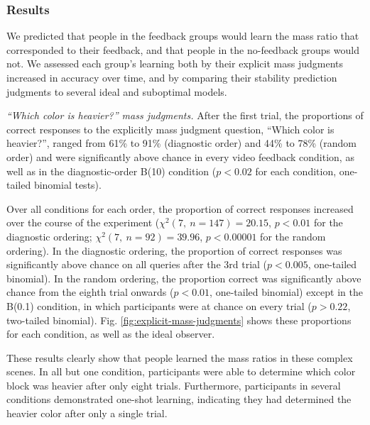 \documentclass[10pt,letterpaper]{article}
\newcommand{\TODO}[1]{\textcolor{red}{[TODO: #1]}}
\newcommand{\vfb}[0]{video feedback}
\newcommand{\fblow}[0]{B(0.1)}
\newcommand{\fbhigh}[0]{B(10)}
\newcommand{\diag}[1]{diagnostic-order #1}
\begin{document}



\subsubsection{Results}

We predicted that people in the feedback groups would learn the mass
ratio that corresponded to their feedback, and that people in the
no-feedback groups would not. We assessed each group's learning both
by their explicit mass judgments increased in accuracy over time, and
by comparing their stability prediction judgments to several ideal and
suboptimal models.

\textit{``Which color is heavier?'' mass judgments.} After the first
trial, the proportions of correct responses to the explicitly mass
judgment question, ``Which color is heavier?'', ranged from 61\% to
91\% (diagnostic order) and 44\% to 78\% (random order) and were
significantly above chance in every \vfb{} condition, as well as in
the \diag{\fbhigh{}} condition ($p<0.02$ for each condition,
one-tailed binomial tests).

Over all conditions for each order, the proportion of correct
responses increased over the course of the experiment ($\chi^2(7,\
n=147)=20.15$, $p<0.01$ for the diagnostic ordering; $\chi^2(7,\
n=92)=39.96$, $p<0.00001$ for the random ordering). In the diagnostic
ordering, the proportion of correct responses was significantly above
chance on all queries after the 3rd trial ($p<0.005$, one-tailed
binomial). In the random ordering, the proportion correct was
significantly above chance from the eighth trial onwards ($p<0.01$,
one-tailed binomial) except in the \fblow{} condition, in which
participants were at chance on every trial ($p>0.22$, two-tailed
binomial). Fig. \ref{fig:explicit-mass-judgments} shows these
proportions for each condition, as well as the ideal observer.

These results clearly show that people learned the mass ratios in
these complex scenes. In all but one condition, participants were able
to determine which color block was heavier after only eight trials.
Furthermore, participants in several conditions demonstrated one-shot
learning, indicating they had determined the heavier color after only
a single trial.
\end{document}
